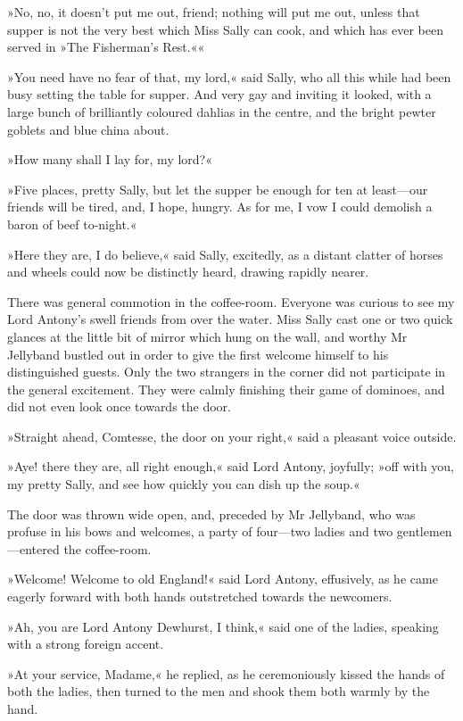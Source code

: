 »No, no, it doesn't put me out, friend; nothing will put me out, unless that supper is not the very best which Miss Sally can cook, and which has ever been served in »The Fisherman's Rest.««

»You need have no fear of that, my lord,« said Sally, who all this while had been busy setting the table for supper. And very gay and inviting it looked, with a large bunch of brilliantly coloured dahlias in the centre, and the bright pewter goblets and blue china about.

»How many shall I lay for, my lord?«

»Five places, pretty Sally, but let the supper be enough for ten at least—our friends will be tired, and, I hope, hungry. As for me, I vow I could demolish a baron of beef to-night.«

»Here they are, I do believe,« said Sally, excitedly, as a distant clatter of horses and wheels could now be distinctly heard, drawing rapidly nearer.

There was general commotion in the coffee-room. Everyone was curious to see my Lord Antony's swell friends from over the water. Miss Sally cast one or two quick glances at the little bit of mirror which hung on the wall, and worthy Mr Jellyband bustled out in order to give the first welcome himself to his distinguished guests. Only the two strangers in the corner did not participate in the general excitement. They were calmly finishing their game of dominoes, and did not even look once towards the door.

»Straight ahead, Comtesse, the door on your right,« said a pleasant voice outside.

»Aye! there they are, all right enough,« said Lord Antony, joyfully; »off with you, my pretty Sally, and see how quickly you can dish up the soup.«

The door was thrown wide open, and, preceded by Mr Jellyband, who was profuse in his bows and welcomes, a party of four—two ladies and two gentlemen—entered the coffee-room.

»Welcome! Welcome to old England!« said Lord Antony, effusively, as he came eagerly forward with both hands outstretched towards the newcomers.

»Ah, you are Lord Antony Dewhurst, I think,« said one of the ladies, speaking with a strong foreign accent.

»At your service, Madame,« he replied, as he ceremoniously kissed the hands of both the ladies, then turned to the men and shook them both warmly by the hand.

